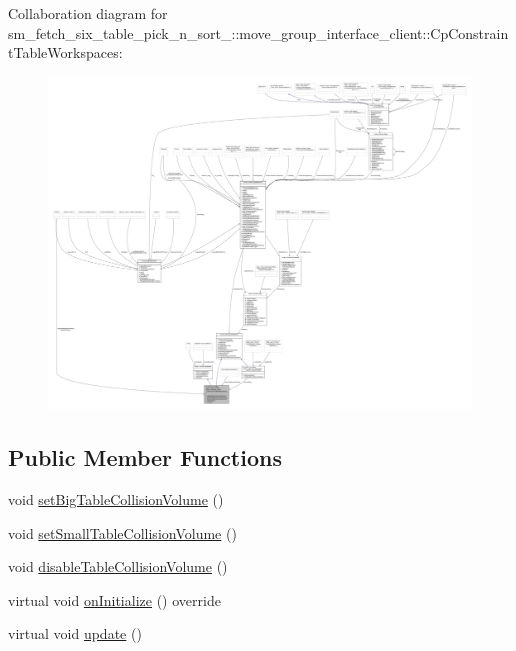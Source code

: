 Collaboration diagram for sm\+\_\+fetch\+\_\+six\+\_\+table\+\_\+pick\+\_\+n\+\_\+sort\+\_\+:\+:move\+\_\+group\+\_\+interface\+\_\+client\+:\+:Cp\+Constraint\+Table\+Workspaces\+:
\nopagebreak
\begin{figure}[H]
\begin{center}
\leavevmode
\includegraphics[width=350pt]{classsm__fetch__six__table__pick__n__sort__1_1_1move__group__interface__client_1_1CpConstraintTableWorkspaces__coll__graph}
\end{center}
\end{figure}
\subsection*{Public Member Functions}
\begin{DoxyCompactItemize}
\item 
void \hyperlink{classsm__fetch__six__table__pick__n__sort__1_1_1move__group__interface__client_1_1CpConstraintTableWorkspaces_a135da93bbac81518b8551f39221ce47f}{set\+Big\+Table\+Collision\+Volume} ()
\item 
void \hyperlink{classsm__fetch__six__table__pick__n__sort__1_1_1move__group__interface__client_1_1CpConstraintTableWorkspaces_a65cb88bd556ced33b106e8f5dd4ce2f3}{set\+Small\+Table\+Collision\+Volume} ()
\item 
void \hyperlink{classsm__fetch__six__table__pick__n__sort__1_1_1move__group__interface__client_1_1CpConstraintTableWorkspaces_a5aa2a5b0a497246799e2d4774e2a3ad8}{disable\+Table\+Collision\+Volume} ()
\item 
virtual void \hyperlink{classsm__fetch__six__table__pick__n__sort__1_1_1move__group__interface__client_1_1CpConstraintTableWorkspaces_a07f404b48f6e94f9cdf0a01eef460d64}{on\+Initialize} () override
\item 
virtual void \hyperlink{classsm__fetch__six__table__pick__n__sort__1_1_1move__group__interface__client_1_1CpConstraintTableWorkspaces_a2588601a0f45af921e1864f8ba765c51}{update} ()
\end{DoxyCompactItemize}
